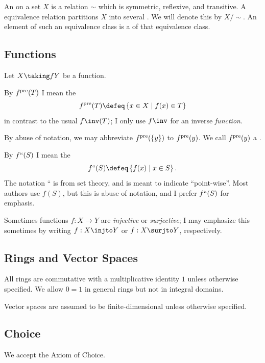 
An  on a set $X$ is a relation $\sim$
which is symmetric, reflexive, and transitive.
A equivalence relation partitions $X$ into several .
We will denote this by $X / {\sim}$.
An element of such an equivalence class is a  of that equivalence class.


\subsection*{Functions}
Let $X \taking f Y$ be a function.

\begin{itemize}
\ii By $f^{\text{pre}}(T)$ I mean the 
\[ f\pre(T) \defeq \left\{ x \in X \mid f(x) \in T \right\} \]
in contrast to the usual $f\inv(T)$; I only use $f\inv$ for an inverse \emph{function}.

By abuse of notation, we may abbreviate $f^{\text{pre}}(\{y\})$ to $f^{\text{pre}}(y)$.
We call $f^{\text{pre}}(y)$ a .

\ii By $f``(S)$ I mean the 
\[ f``(S) \defeq \left\{ f(x) \mid x \in S \right\}. \]
The notation {``} is from set theory, and is meant to indicate ``point-wise''.
Most authors use $f(S)$, but this is abuse of notation,
and I prefer $f``(S)$ for emphasis.

\ii Sometimes functions $f : X \to Y$ are \emph{injective} or \emph{surjective};
I may emphasize this sometimes by writing $f : X \injto Y$ or $f : X \surjto Y$, respectively.
\end{itemize}

\subsection*{Rings and Vector Spaces}
All rings are commutative with a multiplicative identity $1$ unless otherwise specified.
We allow $0=1$ in general rings but not in integral domains.

Vector spaces are assumed to be finite-dimensional unless otherwise specified.

\subsection*{Choice}
We accept the Axiom of Choice.
